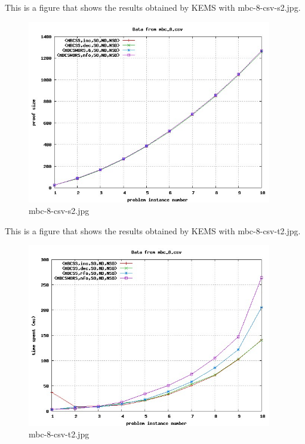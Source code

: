 This is a figure that shows the results obtained by KEMS with mbc-8-csv-s2.jpg.
\begin{figure}[htbp]
\begin{center}
\includegraphics[width=0.95\textwidth]{figuras/mbc-8-csv-s2.jpg}
\end{center}
\caption{mbc-8-csv-s2.jpg}
\end{figure}

This is a figure that shows the results obtained by KEMS with mbc-8-csv-t2.jpg.
\begin{figure}[htbp]
\begin{center}
\includegraphics[width=0.95\textwidth]{figuras/mbc-8-csv-t2.jpg}
\end{center}
\caption{mbc-8-csv-t2.jpg}
\end{figure}

